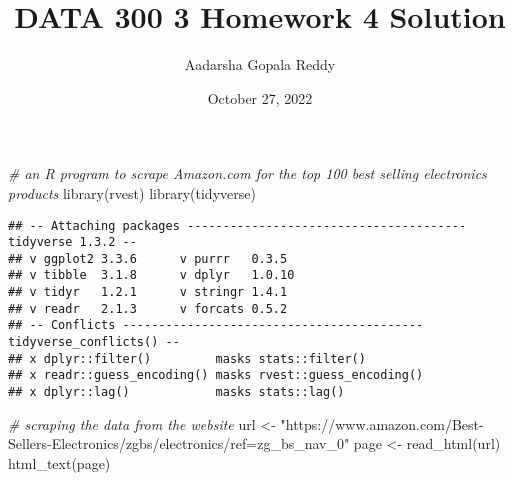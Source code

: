 \documentclass[
]{article}
\title{DATA 300 3 Homework 4 Solution}
\author{Aadarsha Gopala Reddy}
\date{October 27, 2022}
\newenvironment{Shaded}{\begin{snugshade}}{\end{snugshade}}
\newcommand{\CommentTok}[1]{\textcolor[rgb]{0.56,0.35,0.01}{\textit{#1}}}
\newcommand{\FunctionTok}[1]{\textcolor[rgb]{0.00,0.00,0.00}{#1}}
\newcommand{\NormalTok}[1]{#1}
\newcommand{\OtherTok}[1]{\textcolor[rgb]{0.56,0.35,0.01}{#1}}
\newcommand{\StringTok}[1]{\textcolor[rgb]{0.31,0.60,0.02}{#1}}
\begin{document}
\maketitle

{
\setcounter{tocdepth}{2}
\tableofcontents
}
\begin{Shaded}
\begin{Highlighting}[]
\CommentTok{\# an R program to scrape Amazon.com for the top 100 best selling electronics products}
\FunctionTok{library}\NormalTok{(rvest)}
\FunctionTok{library}\NormalTok{(tidyverse)}
\end{Highlighting}
\end{Shaded}

\begin{verbatim}
## -- Attaching packages --------------------------------------- tidyverse 1.3.2 --
## v ggplot2 3.3.6      v purrr   0.3.5 
## v tibble  3.1.8      v dplyr   1.0.10
## v tidyr   1.2.1      v stringr 1.4.1 
## v readr   2.1.3      v forcats 0.5.2 
## -- Conflicts ------------------------------------------ tidyverse_conflicts() --
## x dplyr::filter()         masks stats::filter()
## x readr::guess_encoding() masks rvest::guess_encoding()
## x dplyr::lag()            masks stats::lag()
\end{verbatim}

\begin{Shaded}
\begin{Highlighting}[]
\CommentTok{\# scraping the data from the website}
\NormalTok{url }\OtherTok{\textless{}{-}} \StringTok{"https://www.amazon.com/Best{-}Sellers{-}Electronics/zgbs/electronics/ref=zg\_bs\_nav\_0"}
\NormalTok{page }\OtherTok{\textless{}{-}} \FunctionTok{read\_html}\NormalTok{(url)}
\FunctionTok{html\_text}\NormalTok{(page)}
\end{Highlighting}
\end{Shaded}
\end{document}
